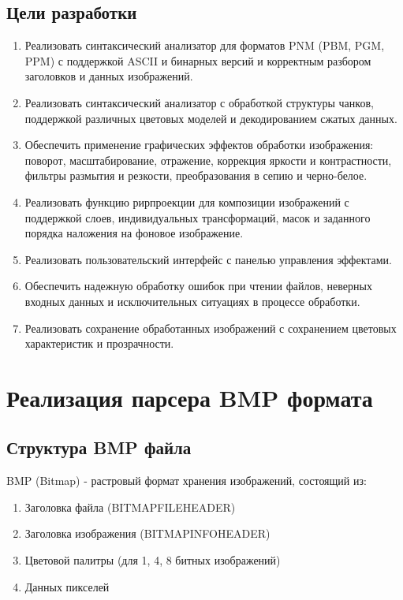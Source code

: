 \documentclass[a4paper,12pt]{article}
\begin{document}
	\subsection*{Цели разработки}
	\begin{enumerate}
		\item Реализовать синтаксический анализатор для форматов PNM (PBM, PGM, PPM) с поддержкой ASCII и бинарных версий и корректным разбором заголовков и данных изображений.
		\item Реализовать синтаксический анализатор с обработкой структуры чанков, поддержкой различных цветовых моделей и декодированием сжатых данных.
		\item Обеспечить применение графических эффектов обработки изображения: поворот, масштабирование, отражение, коррекция яркости и контрастности, фильтры размытия и резкости, преобразования в сепию и черно-белое.
		\item Реализовать функцию рирпроекции для композиции изображений с поддержкой слоев, индивидуальных трансформаций, масок и заданного порядка наложения на фоновое изображение.
		\item Реализовать пользовательский интерфейс с панелью управления эффектами.
		\item Обеспечить надежную обработку ошибок при чтении файлов, неверных входных данных и исключительных ситуациях в процессе обработки.
		\item Реализовать сохранение обработанных изображений с сохранением цветовых характеристик и прозрачности.
	\end{enumerate}
	
	
	\newpage
	\section{Реализация парсера BMP формата}
	
	\subsection{Структура BMP файла}
	
	BMP (Bitmap) - растровый формат хранения изображений, состоящий из:
	
	\begin{enumerate}
		\item Заголовка файла (BITMAPFILEHEADER)
		\item Заголовка изображения (BITMAPINFOHEADER)
		\item Цветовой палитры (для 1, 4, 8 битных изображений)
		\item Данных пикселей
	\end{enumerate}
	
\end{document}

